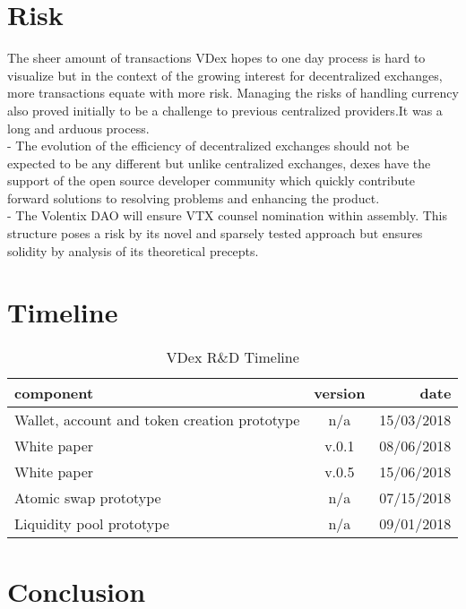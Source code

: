 \documentclass[]{article}
\begin{document}
\section{Risk}
	The sheer amount of transactions VDex hopes to one day process is 
	hard to visualize but in the context of the growing interest for decentralized exchanges, more transactions equate with more risk. 
	Managing the risks of handling currency also proved initially to be a challenge to previous centralized providers.It was a long and arduous process.\\
	- The evolution of the efficiency of decentralized exchanges should not be expected to be any different but unlike centralized exchanges, dexes have the support of the open source developer community which quickly contribute forward solutions to resolving problems and enhancing the product. \\
	- The Volentix DAO will ensure VTX counsel nomination within assembly. This structure poses a risk by its novel and sparsely tested approach but ensures solidity by analysis of its theoretical precepts.   
	
\section{Timeline}	
\begin{table}[h!]
	\begin{center}
		\caption{VDex R\&D Timeline}
		\label{tab:table1}
		\begin{tabular}{l|c|r}
			\textbf{component} & \textbf{version}&  \textbf{date}  \\
			\hline
			Wallet, account and token creation prototype  & n/a & 15/03/2018\\
			\hline			
			White paper  & v.0.1 & 08/06/2018\\
			\hline
			White paper  & v.0.5 & 15/06/2018\\
			\hline
			Atomic swap prototype  & n/a & 07/15/2018\\
			\hline
			Liquidity pool prototype  & n/a & 09/01/2018\\
			\hline
			
		\end{tabular}
	\end{center}
\end{table}
		
\section{Conclusion}
\end{document}
